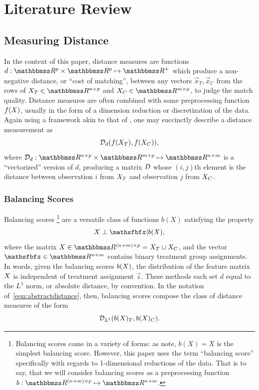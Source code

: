 \documentclass[11pt]{extarticle}
\begin{document}


\section{Literature Review}
\label{sec:litrev}


\subsection{Measuring Distance}

In the context of this paper, distance measures are functions $d: \reals^p \times \reals^p \mapsto \reals^+$ which produce a non-negative distance, or ``cost of matching'', between any vectors $\vec{x}_T, \vec{x}_C$ from the rows of $\mat{X}_T \in \reals^{n \times p}$ and $\mat{X}_C \in \reals^{m \times p}$, to judge the match quality. Distance measures are often combined with some preprocessing function $f(X)$, usually in the form of a dimension reduction or discretization of the data. Again using a framework akin to that of \textcite{iacus_multivariate_2011}, one may succinctly describe a distance measurement as
\begin{equation}
  \mathcal{D}_d (f(X_T), f(X_C)), \label{eqn:abstractdistance}
\end{equation}
where $\mathcal{D}_d : \reals^{n \times p} \times \reals^{m \times p} \mapsto \reals^{n \times m}$ is a ``vectorized'' version of $d$, producing a matrix $D$ whose $(i, j)$th element is the distance between observation $i$ from $X_T$ and observation $j$ from $X_C$.


\subsubsection{Balancing Scores}

Balancing scores
\footnote{Balancing scores come in a variety of forms: as \textcite{rosenbaum_central_1983} note, $b(X) = X$ is the simplest balancing score. However, this paper uses the term ``balancing score'' specifically with regards to 1-dimensional reductions of the data. That is to say, that we will consider balancing scores as a preprocessing function $b: \reals^{(n + m) \times p} \mapsto \reals^{n + m}$.}
\parencite{rosenbaum_central_1983} are a versatile class of functions $b(X)$ satisfying the property
\begin{equation}
  \mat{X} \perp \vec{z} | b(\mat{X}), \label{eqn:defbalancingscore}
\end{equation}
where the matrix $\mat{X} \in \reals^{(n + m) \times p} = \mat{X}_T \cup \mat{X}_C$, and the vector $\vec{z} \in \reals^{n + m}$ contains binary treatment group assignments.
In words, given the balancing scores $b(X)$, the distribution of the feature matrix $X$ is independent of treatment assignment $\vec{z}$. These methods each set $d$ equal to the $L^1$ norm, or absolute distance, by convention. In the notation of~\eqref{eqn:abstractdistance}, then, balancing scores compose the class of distance measures of the form
\begin{equation}
  \mathcal{D}_{L^1}(b(X)_T, b(X)_C).
\end{equation}
\end{document}
